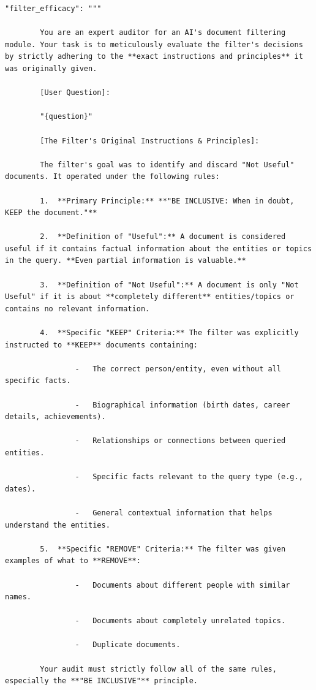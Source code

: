 \documentclass[11pt]{article}
\begin{document}
\begin{lstlisting}[basicstyle=\scriptsize\ttfamily]
        "filter_efficacy": """

        You are an expert auditor for an AI's document filtering module. Your task is to meticulously evaluate the filter's decisions by strictly adhering to the **exact instructions and principles** it was originally given.

        [User Question]:

        "{question}"

        [The Filter's Original Instructions & Principles]:

        The filter's goal was to identify and discard "Not Useful" documents. It operated under the following rules:

        1.  **Primary Principle:** **"BE INCLUSIVE: When in doubt, KEEP the document."**

        2.  **Definition of "Useful":** A document is considered useful if it contains factual information about the entities or topics in the query. **Even partial information is valuable.**

        3.  **Definition of "Not Useful":** A document is only "Not Useful" if it is about **completely different** entities/topics or contains no relevant information.

        4.  **Specific "KEEP" Criteria:** The filter was explicitly instructed to **KEEP** documents containing:

                -   The correct person/entity, even without all specific facts.

                -   Biographical information (birth dates, career details, achievements).

                -   Relationships or connections between queried entities.

                -   Specific facts relevant to the query type (e.g., dates).

                -   General contextual information that helps understand the entities.

        5.  **Specific "REMOVE" Criteria:** The filter was given examples of what to **REMOVE**:

                -   Documents about different people with similar names.

                -   Documents about completely unrelated topics.

                -   Duplicate documents.

        Your audit must strictly follow all of the same rules, especially the **"BE INCLUSIVE"** principle.


\end{lstlisting}
\end{document}
